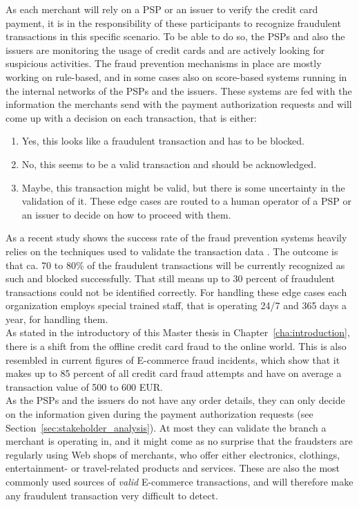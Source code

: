 As each merchant will rely on a \gls{PSP} or an issuer to verify the credit card payment, it is in the responsibility of these participants to recognize fraudulent transactions in this specific scenario. To be able to do so, the \gls{PSP}s and also the issuers are monitoring the usage of credit cards and are actively looking for suspicious activities. The fraud prevention mechanisms in place are mostly working on rule-based, and in some cases also on score-based systems running in the internal networks of the \gls{PSP}s and the issuers. These systems are fed with the information the merchants send with the payment authorization requests and will come up with a decision on each transaction, that is either:\@

\begin{enumerate}
  \item Yes, this looks like a fraudulent transaction and has to be blocked.
  \item No, this seems to be a valid transaction and should be acknowledged.
  \item Maybe, this transaction might be valid, but there is some uncertainty in the validation of it. These edge cases are routed to a human operator of a \gls{PSP} or an issuer to decide on how to proceed with them.
\end{enumerate}

As a recent study shows the success rate of the fraud prevention systems heavily relies on the techniques used to validate the transaction data \citep{rana2015survey}. The outcome is that ca. 70 to 80\% of the fraudulent transactions will be currently recognized as such and blocked successfully. That still means up to 30 percent of fraudulent transactions could not be identified correctly. For handling these edge cases each organization employs special trained staff, that is operating 24/7 and 365 days a year, for handling them. \\

As stated in the introductory of this Master thesis in Chapter~\ref{cha:introduction}, there is a shift from the offline credit card fraud to the online world. This is also resembled in current figures of \gls{E-commerce} fraud incidents, which show that it makes up to 85 percent of all credit card fraud attempts and have on average a transaction value of 500 to 600 EUR.\\

As the \gls{PSP}s and the issuers do not have any order details, they can only decide on the information given during the payment authorization requests (see Section~\ref{sec:stakeholder_analysis}). At most they can validate the branch a merchant is operating in, and it might come as no surprise that the fraudsters are regularly using Web shops of merchants, who offer either electronics, clothings, entertainment- or travel-related products and services. These are also the most commonly used sources of \emph{valid} \gls{E-commerce} transactions, and will therefore make any fraudulent transaction very difficult to detect. \\

